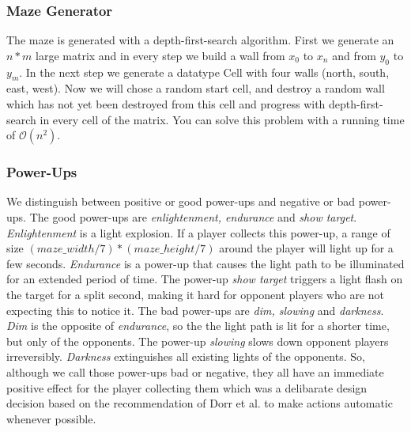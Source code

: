 \documentclass{sigchi}
\begin{document}
\subsubsection{Maze Generator} 
The maze is generated with a depth-first-search algorithm. First we generate an $n*m$ large matrix and in every step we build a wall from $x_{0}$ to $x_{n}$ and from $y_{0}$ to $y_{m}$. In the next step we generate a datatype Cell with four walls (north, south, east, west). Now we will chose a random start cell, and destroy a random wall which has not yet been destroyed from this cell and progress with depth-first-search in every cell of the matrix. You can solve this problem with a running time of $\mathcal{O}(n^2)$.

\subsubsection{Power-Ups} 
We distinguish between positive or good power-ups and negative or bad power-ups. The good power-ups are \textit{enlightenment, endurance} and \textit{show target}. \textit{Enlightenment} is a light explosion. If a player collects this power-up, a range of size $(maze\_width / 7) * (maze\_height / 7)$ around the player will light up for a few seconds. \textit{Endurance} is a power-up that causes the light path to be illuminated for an extended period of time. The power-up \textit{show target} triggers a light flash on the target for a split second, making it hard for opponent players who are not expecting this to notice it. The bad power-ups are \textit{dim, slowing} and \textit{darkness}. \textit{Dim} is the opposite of \textit{endurance}, so the the light path is lit for a shorter time, but only of the opponents. The power-up \textit{slowing} slows down opponent players irreversibly. \textit{Darkness} extinguishes all existing lights of the opponents. So, although we call those power-ups bad or negative, they all have an immediate positive effect for the player collecting them which was a delibarate design decision based on the recommendation of Dorr et al. to make actions automatic whenever possible. \cite{dorr2009gaze}
\end{document}
